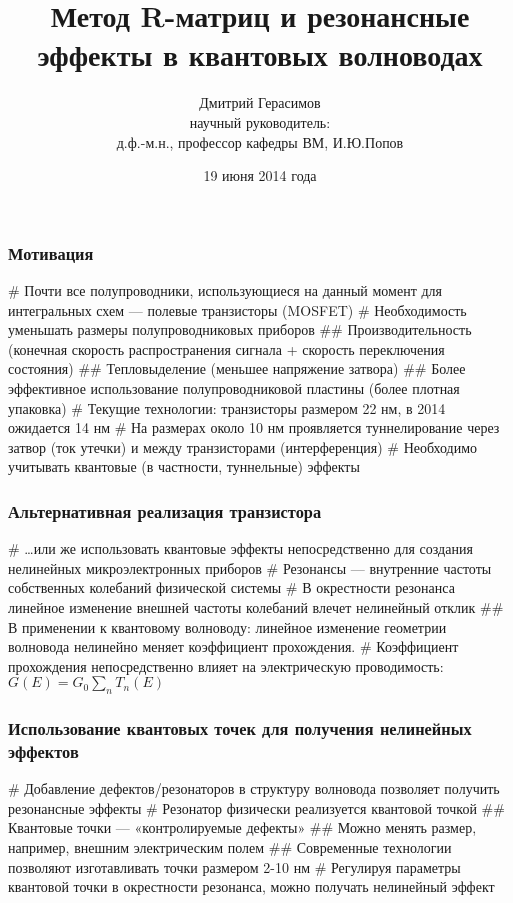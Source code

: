 \documentclass{beamer}
\title[]{Метод R-матриц и резонансные эффекты в квантовых волноводах}
\author[Дмитрий Герасимов]{Дмитрий Герасимов\\{\small научный руководитель: \\ д.ф.-м.н., профессор кафедры ВМ, И.Ю.Попов}}
\institute[ИТМО]{Университет ИТМО}
\date{19 июня 2014 года}
\begin{document}
\maketitle

\begin{frame}[fragile]
\frametitle{Мотивация}
\begin{easylist}[itemize]
# Почти все полупроводники, использующиеся на данный момент для интегральных схем — полевые транзисторы (MOSFET)
# Необходимость уменьшать размеры полупроводниковых приборов
## Производительность (конечная скорость распространения сигнала + скорость переключения состояния)
## Тепловыделение (меньшее напряжение затвора)
## Более эффективное использование полупроводниковой пластины (более плотная упаковка)
# Текущие технологии: транзисторы размером 22 нм, в 2014 ожидается 14 нм
# На размерах около 10 нм проявляется туннелирование через затвор (ток утечки) и между транзисторами (интерференция)
# Необходимо учитывать квантовые (в частности, туннельные) эффекты
\end{easylist}
\end{frame}

\begin{frame}[fragile]
\frametitle{Альтернативная реализация транзистора}
\begin{easylist}[itemize]
# \dots или же использовать квантовые эффекты непосредственно для создания нелинейных микроэлектронных приборов
# Резонансы — внутренние частоты собственных колебаний физической системы
# В окрестности резонанса линейное изменение внешней частоты колебаний влечет нелинейный отклик
## В применении к квантовому волноводу: линейное изменение геометрии волновода нелинейно меняет коэффициент прохождения.
# Коэффициент прохождения непосредственно влияет на электрическую проводимость: $G(E) = G_0 \sum\limits_n T_n(E)$
\end{easylist}
\end{frame}

\begin{frame}[fragile]
\frametitle{Использование квантовых точек для получения нелинейных эффектов}
\begin{easylist}[itemize]
# Добавление дефектов/резонаторов в структуру волновода позволяет получить резонансные эффекты
# Резонатор физически реализуется квантовой точкой
## Квантовые точки — «контролируемые дефекты»
## Можно менять размер, например, внешним электрическим полем
## Современные технологии позволяют изготавливать точки размером 2-10 нм
# Регулируя параметры квантовой точки в окрестности резонанса, можно получать нелинейный эффект
\end{easylist}
\end{frame}
\end{document}
